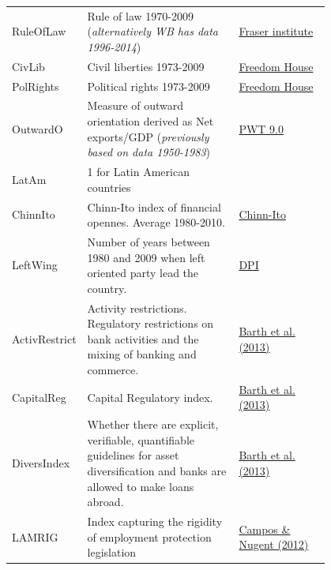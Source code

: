 \documentclass[a4paper,11pt]{article}
\begin{document}
\begin{center}
\begin{longtable}{l p{0.50\linewidth} p{0.3\linewidth}}
			RuleOfLaw & Rule of law 1970-2009 (\textit{alternatively WB has data 1996-2014})& \href{http://efwdata.com/grid/WxRvYnU#/Grid}{Fraser institute} \\
			
			CivLib & Civil liberties 1973-2009 & \href{https://freedomhouse.org/report/freedom-world-2016/methodology}{Freedom House} \\
			
			PolRights & Political rights 1973-2009 & \href{https://freedomhouse.org/report/freedom-world-2016/methodology}{Freedom House} \\
			
			OutwardO & Measure of outward orientation derived as Net exports/GDP (\textit{previously based on data 1950-1983}) & \href{http://www.rug.nl/research/ggdc/data/pwt/pwt-9.0}{PWT 9.0} \\
			
			LatAm & 1 for Latin American countries & \\
			
			ChinnIto & Chinn-Ito index of financial opennes. Average 1980-2010. & \href{http://web.pdx.edu/~ito/Chinn-Ito_website.htm}{Chinn-Ito} \\ 
			
			LeftWing & Number of years between 1980 and 2009 when left oriented party lead the country. & \href{http://www.nsd.uib.no/macrodataguide/set.html?id=11&sub=1}{DPI} \\
			
			ActivRestrict & Activity restrictions. Regulatory restrictions on bank activities and the mixing of banking and commerce. & \href{http://faculty.haas.berkeley.edu/ross_levine/regulation.htm}{Barth et al. (2013)} \\
			
			CapitalReg & Capital Regulatory index. & \href{http://faculty.haas.berkeley.edu/ross_levine/regulation.htm}{Barth et al. (2013)} \\
			
			DiversIndex & Whether there are explicit, verifiable, quantifiable guidelines for asset diversification and banks are allowed to make loans abroad. & \href{http://faculty.haas.berkeley.edu/ross_levine/regulation.htm}{Barth et al. (2013)} \\
			
			LAMRIG & Index capturing the rigidity of employment protection legislation & \href{https://www.iza.org/publications/dp/6881}{Campos \& Nugent (2012)} \\
			

\end{longtable}
\end{center}
\end{document}
